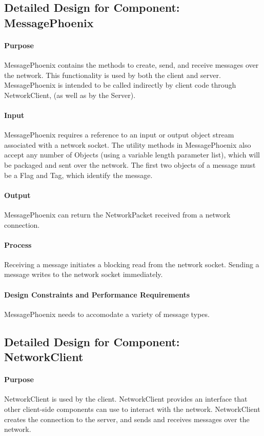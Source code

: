 \documentclass[12pt,a4paper,titlepage]{article}
\begin{document}
\subsection{Detailed Design for Component: MessagePhoenix}
\paragraph{Purpose} MessagePhoenix contains the methods to create, send, and receive messages over the network. This functionality is used by both the client and server. MessagePhoenix is intended to be called indirectly by client code through NetworkClient, (as well as by the Server).
\paragraph{Input} MessagePhoenix requires a reference to an input or output object stream associated with a network socket. The utility methods in MessagePhoenix also accept any number of Objects (using a variable length parameter list), which will be packaged and sent over the network. The first two objects of a message must be a Flag and Tag, which identify the message. 
\paragraph{Output} MessagePhoenix can return the NetworkPacket received from a network connection. 
\paragraph{Process} Receiving a message initiates a blocking read from the network socket. Sending a message writes to the network socket immediately. 
\paragraph{Design Constraints and Performance Requirements} MessagePhoenix needs to accomodate a variety of message types. 

\subsection{Detailed Design for Component: NetworkClient }
\paragraph{Purpose} NetworkClient is used by the client. NetworkClient provides an interface that other client-side components can use to interact with the network. NetworkClient creates the connection to the server, and sends and receives messages over the network.
\end{document}
